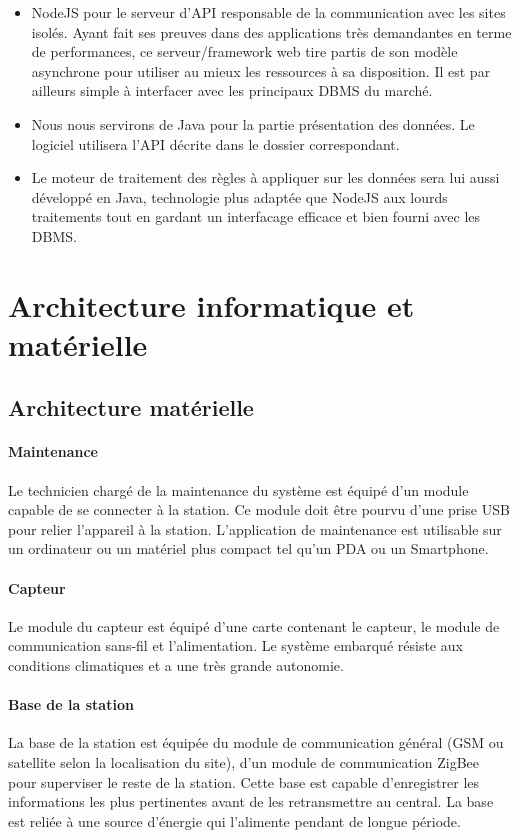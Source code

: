 \begin{itemize}
\item NodeJS pour le serveur d'API responsable de la communication avec les sites isolés. Ayant fait ses preuves dans des applications très demandantes en terme de performances, ce serveur/framework web tire partis de son modèle asynchrone pour utiliser au mieux les ressources à sa disposition. Il est par ailleurs simple à interfacer avec les principaux DBMS du marché.
\item Nous nous servirons de Java pour la partie présentation des données. Le logiciel utilisera l'API décrite dans le dossier correspondant.
\item Le moteur de traitement des règles à appliquer sur les données sera lui aussi développé en Java, technologie plus adaptée que NodeJS aux lourds traitements tout en gardant un interfacage efficace et bien fourni avec les DBMS.
\end{itemize}

\section{Architecture informatique et matérielle}

\subsection{Architecture matérielle}

\paragraph{Maintenance} Le technicien chargé de la maintenance du système est équipé d’un module capable de se connecter à la station. Ce module doit être pourvu d’une prise USB pour relier l’appareil à la station. L’application de maintenance est utilisable sur un ordinateur  ou un matériel plus compact tel qu’un PDA ou un Smartphone. 

\paragraph{Capteur} Le module du capteur est équipé d’une carte contenant le capteur, le module de communication sans-fil et l’alimentation. Le système embarqué résiste aux conditions climatiques et a une très grande autonomie.

\paragraph{Base de la station} La base de la station est équipée du module de communication général  (GSM ou satellite selon la localisation du site), d’un module de communication ZigBee pour superviser le reste de la station. Cette base est capable d’enregistrer les informations les plus pertinentes avant de les retransmettre au central. La base est reliée à une source d’énergie qui l’alimente pendant de longue période. 

